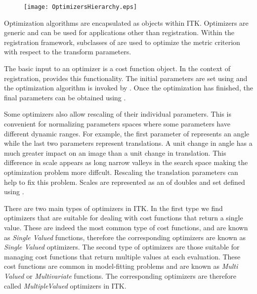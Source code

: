 


\begin{figure}
\center
\texttt{[image: OptimizersHierarchy.eps]}
\label{fig:OptimizersHierarchy}
\end{figure}

Optimization algorithms are encapsulated as  objects
within ITK. Optimizers are generic and can be used for applications other than
registration.  Within the registration framework, subclasses of
 are used to optimize the metric
criterion with respect to the transform parameters.


The basic input to an optimizer is a cost function object. In the context
of registration,  provides this functionality.
The initial parameters are set using  and
the optimization algorithm is invoked by .
Once the optimization has finished, the final parameters can be obtained
using .

Some optimizers also allow rescaling of their individual parameters. This is
convenient for normalizing parameters spaces where some parameters have
different dynamic ranges. For example, the first parameter of
 represents an angle while the last two parameters
represent translations. A unit change in angle has a much greater impact on an
image than a unit change in translation. This difference in scale appears as
long narrow valleys in the search space making the optimization problem more
diffcult. Rescaling the translation parameters can help to fix this problem.
Scales are represented as an  of doubles and set defined using
.

There are two main types of optimizers in ITK. In the first type we find
optimizers that are suitable for dealing with cost functions that return a
single value. These are indeed the most common type of cost functions, and are
known as \emph{Single Valued} functions, therefore the corresponding optimizers
are known as \emph{Single Valued} optimizers. The second type of optimizers are
those suitable for managing cost functions that return multiple values at each
evaluation. These cost functions are common in model-fitting problems and are
known as \emph{Multi Valued} or \emph{Multivariate} functions.  The
corresponding optimizers are therefore called \emph{MultipleValued} optimizers
in ITK.

